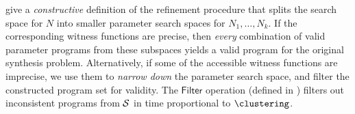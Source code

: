  give a \emph{constructive} definition of the refinement procedure that splits the
search space for $N$ into smaller parameter search spaces for $N_1,\dots,N_k$.
If the corresponding witness functions are precise, then \emph{every} combination of valid parameter programs from these
subspaces yields a valid program for the original synthesis problem.
Alternatively, if some of the accessible witness functions are imprecise, we use them to \emph{narrow down} the
parameter search space, and filter the constructed program set for validity.
The $\mathsf{Filter}$ operation (defined in ) filters out inconsistent programs from $\mathcal{S}$ in time
proportional to $\clustering$.

